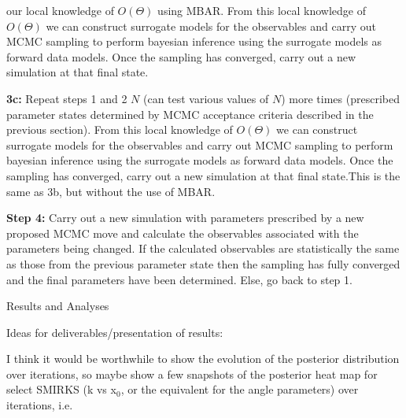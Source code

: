 \documentclass{report}
\begin{document}
\begin{outline}
\begin{outline}
\begin{outline}
\begin{outline}
\begin{outline}
\begin{outline}
{                               our local knowledge of $O\left(\Theta\right)$ using MBAR. From this local knowledge of $O\left(\Theta\right)$ we can construct surrogate models for the observables and carry out MCMC sampling 
                               to perform bayesian inference using the surrogate models as forward data models. Once the sampling has converged, carry out a new simulation at that final state.}
            \item{\textbf{3c:} Repeat steps 1 and 2 $N$ (can test various values of $N$) more times (prescribed parameter states determined by MCMC acceptance criteria described in the previous section).
                               From this local knowledge of $O\left(\Theta\right)$ we can construct surrogate models for the observables and carry out MCMC sampling to perform bayesian inference using 
                               the surrogate models as forward data models. Once the sampling has converged, carry out a new simulation at that final state.This is the same as 3b, but without the use of MBAR.}
          \end{outline}
          \item{\textbf{Step 4:} Carry out a new simulation with parameters prescribed by a new proposed MCMC move and calculate the observables associated
                with the parameters being changed. If the calculated observables are statistically the same as those from the previous parameter state then
                the sampling has fully converged and the final parameters have been determined. Else, go back to step 1.}
        \end{outline}
      \end{outline}
    \end{outline}
  \end{outline} 
     
  \item{Results and Analyses}
  \begin{outline}
    \item{Ideas for deliverables/presentation of results:}
    \begin{outline}
      \item{I think it would be worthwhile to show the evolution of the posterior distribution over iterations, so maybe show a few snapshots of 
                the posterior heat map for select SMIRKS (k vs x$_0$, or the equivalent for the angle parameters) over iterations, i.e.  
      \begin{figure}[h!]
      \centering
  

\end{figure}}
\end{outline}
\end{outline}
\end{outline}
\end{document}
